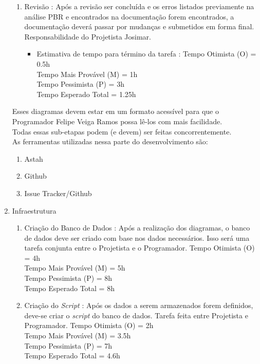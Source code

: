 \documentclass[12pt,a4paper,final]{report}
\begin{document}
\begin{enumerate}
\begin{enumerate}
\item Revisão : Após a revisão ser concluída e os erros listados previamente na análise PBR e encontrados na documentação forem encontrados, a documentação deverá passar por mudanças e submetidos em forma final. Responsabilidade do Projetista Josimar.
\begin{itemize}
\item Estimativa de tempo para término da tarefa :
Tempo Otimista (O) = 0.5h\\
Tempo Mais Provável (M) = 1h\\
Tempo Pessimista (P) = 3h\\
Tempo Esperado Total = 1.25h
\end{itemize} 
\end{enumerate}

Esses diagramas devem estar em um formato acessível para que o Programador Felipe Veiga Ramos possa lê-los com mais facilidade.\\
Todas essas sub-etapas podem (e devem) ser feitas concorrentemente.\\
As ferramentas utilizadas nessa parte do desenvolvimento são:
\begin{enumerate}
\item Astah
\item Github
\item Issue Tracker/Github
\end{enumerate}

\item Infraestrutura
\begin{enumerate}
\item Criação do Banco de Dados : Após a realização dos diagramas, o banco de dados deve ser criado com base nos dados necessários. Isso será uma tarefa conjunta entre o Projetista e o Programador.
Tempo Otimista (O) = 4h\\
Tempo Mais Provável (M) = 5h\\
Tempo Pessimista (P) = 8h\\
Tempo Esperado Total = 8h

\item Criação do \textit{Script} : Após os dados a serem armazenados forem definidos, deve-se criar o \textit{script} do banco de dados. Tarefa feita entre Projetista e Programador.
Tempo Otimista (O) = 2h\\
Tempo Mais Provável (M) = 3.5h\\
Tempo Pessimista (P) = 7h\\
Tempo Esperado Total = 4.6h


\end{enumerate}
\end{enumerate}
\end{document}
